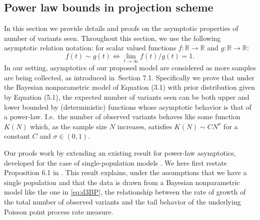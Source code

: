 

\subsection{Power law bounds in projection scheme}
\label{sec:projection_scheme_proof}

In this section we provide details and proofs on the asymptotic properties of number of variants seen.
Throughout this section, we use the following asymptotic relation notation: for scalar valued functions $f : \mathbb{R} \to \mathbb{R}$ and $g : \mathbb{R} \to \mathbb{R}$:
\[
	f(t)\sim g(t) \iff \lim_{t\to \infty} f(t)/g(t) = 1.
\]
In our setting, asymptotics of our proposed model are considered as more samples are being collected, as introduced in~Section 7.1. 
Specifically we prove that under the Bayesian nonparametric model of Equation (3.1) with prior distribution given by  Equation (5.1), the expected number of variants seen can be both upper and lower bounded by (deterministic) functions whose asymptotic behavior is that of a power-law. I.e.\ the number of observed variants behaves like some function $K(N)$ which, as the sample size $N$ increases, satisfies $K(N) \sim CN^\sigma$ for a constant $C$ and $\sigma\in (0,1)$.
 
Our proofs work by extending an existing result for power-law asymptotics, developed for the case of single-population models \citep[Proposition 6.1]{Broderick2012}. 
We here first restate Proposition 6.1 in \citet{Broderick2012}. 
This result explains, under the assumptions that we have a single population and that the data is drawn from a Bayesian nonparametric model like the one in \cref{eq:d3BP}, the relationship between the rate of growth of the total number of observed variants and the tail behavior of the underlying Poisson point process rate measure. 

